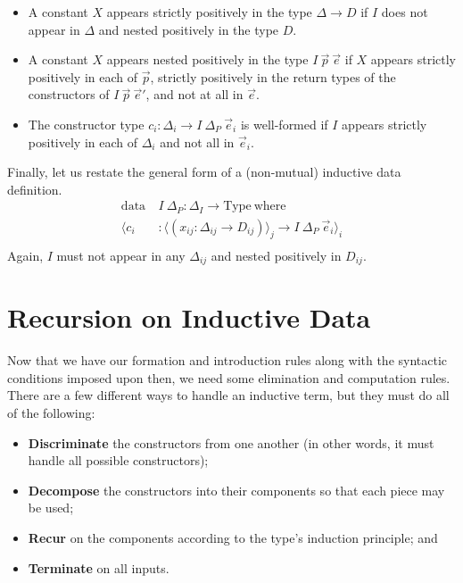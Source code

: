 \documentclass{report}
\newcommand{\const}[1]{\text{#1}}
\newcommand{\data}{\const{data}}
\newcommand{\Type}{\const{Type}}
\newcommand{\where}{\const{where}}
\begin{document}
\begin{itemize}
    \item A constant $X$ appears strictly positively in the type $\Delta \to D$ if $I$ does not appear in $\Delta$ and nested positively in the type $D$.
    \item A constant $X$ appears nested positively in the type $I ~ \Vec{p} ~ \Vec{e}$ if $X$ appears strictly positively in each of $\Vec{p}$, strictly positively in the return types of the constructors of $I ~ \Vec{p} ~ \Vec{e}'$, and not at all in $\Vec{e}$.
    \item The constructor type $c_i: \Delta_i \to I ~ \Delta_P ~ \Vec{e}_i$ is well-formed if $I$ appears strictly positively in each of $\Delta_i$ and not all in $\Vec{e}_i$.
\end{itemize}

Finally, let us restate the general form of a (non-mutual) inductive data definition.
%
\begin{align*}
    \data ~ &I ~ \Delta_P : \Delta_I \to \Type ~ \where \\
    \langle c_i &: \langle (x_{ij}: \Delta_{ij} \to D_{ij}) \rangle_j \to I ~ \Delta_P ~ \Vec{e}_i \rangle_i \\
\end{align*}
%
Again, $I$ must not appear in any $\Delta_{ij}$ and nested positively in $D_{ij}$.

\section{Recursion on Inductive Data}

Now that we have our formation and introduction rules along with the syntactic conditions imposed upon then, we need some elimination and computation rules. There are a few different ways to handle an inductive term, but they must do all of the following:

\begin{itemize}
    \item \textbf{Discriminate} the constructors from one another (in other words, it must handle all possible constructors);
    \item \textbf{Decompose} the constructors into their components so that each piece may be used;
    \item \textbf{Recur} on the components according to the type's induction principle; and
    \item \textbf{Terminate} on all inputs.
\end{itemize}
\end{document}
